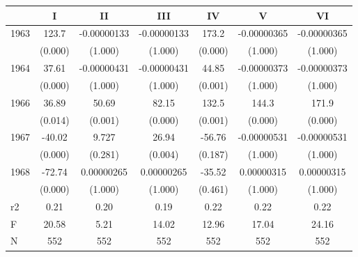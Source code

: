 \begin{tabular}{l*{6}{c}}
\hline\hline
            &\multicolumn{1}{c}{I}&\multicolumn{1}{c}{II}&\multicolumn{1}{c}{III}&\multicolumn{1}{c}{IV}&\multicolumn{1}{c}{V}&\multicolumn{1}{c}{VI}\\
\hline
1963        &       123.7& -0.00000133& -0.00000133&       173.2& -0.00000365& -0.00000365\\
            &     (0.000)&     (1.000)&     (1.000)&     (0.000)&     (1.000)&     (1.000)\\
[1em]
1964        &       37.61& -0.00000431& -0.00000431&       44.85& -0.00000373& -0.00000373\\
            &     (0.000)&     (1.000)&     (1.000)&     (0.001)&     (1.000)&     (1.000)\\
[1em]
1966        &       36.89&       50.69&       82.15&       132.5&       144.3&       171.9\\
            &     (0.014)&     (0.001)&     (0.000)&     (0.001)&     (0.000)&     (0.000)\\
[1em]
1967        &      -40.02&       9.727&       26.94&      -56.76& -0.00000531& -0.00000531\\
            &     (0.000)&     (0.281)&     (0.004)&     (0.187)&     (1.000)&     (1.000)\\
[1em]
1968        &      -72.74&  0.00000265&  0.00000265&      -35.52&  0.00000315&  0.00000315\\
            &     (0.000)&     (1.000)&     (1.000)&     (0.461)&     (1.000)&     (1.000)\\
\hline
r2          &        0.21&        0.20&        0.19&        0.22&        0.22&        0.22\\
F           &       20.58&        5.21&       14.02&       12.96&       17.04&       24.16\\
N           &         552&         552&         552&         552&         552&         552\\
\hline\hline
\end{tabular}
